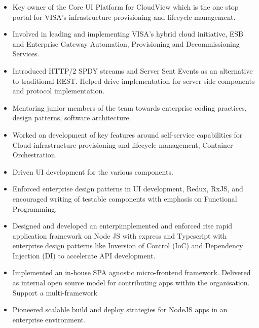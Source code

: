 \documentclass[10pt,a4paper,ragged2e,withhyper]{altacv}
\begin{document}
\begin{paracol}{2}
\divider

\begin{itemize}
  \item Key owner of the Core UI Platform for CloudView which is the one stop portal for VISA’s infrastructure provisioning and lifecycle management.
  \item Involved in leading and implementing VISA’s hybrid cloud initiative, ESB and Enterprise Gateway Automation, Provisioning and Decommissioning Services.
  \item Introduced HTTP/2 SPDY streams and Server Sent Events as an alternative to traditional REST. Helped drive implementation for server side components and protocol implementation.
  \item Mentoring junior members of the team towards enterprise coding practices, design patterns, software architecture.
\end{itemize}

\divider

\begin{itemize}
  \item Worked on development of key features around self-service capabilities for Cloud infrastructure provisioning and lifecycle management, Container Orchestration.
  \item Driven UI development for the various components.
  \item Enforced enterprise design patterns in UI development, Redux, RxJS, and encouraged writing of testable components with emphasis on Functional Programming.
  \item Designed and developed an enterpimplemented and enforced rise rapid application framework on Node JS with express and Typescript with enterprise design patterns like Inversion of Control (IoC) and Dependency Injection (DI) to accelerate API development.
  \item Implemented an in-house SPA agnostic micro-frontend framework. Delivered as internal open source model for contributing apps within the organisation. Support a multi-framework
  \item Pioneered scalable build and deploy strategies for NodeJS apps in an enterprise environment.
\end{itemize}

\divider


\end{paracol}
\end{document}
